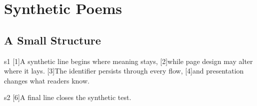 \chapter*{Synthetic Poems}

\section*{A Small Structure}
\begin{PSEStanza}{s1}
[1]{A synthetic line begins where meaning stays,}
[2]{while page design may alter where it lays.}
[3]{The identifier persists through every flow,}
[4]{and presentation changes what readers know.}
\end{PSEStanza}

\begin{PSEStanza}{s2}
[6]{A final line closes the synthetic test.}
\end{PSEStanza}
